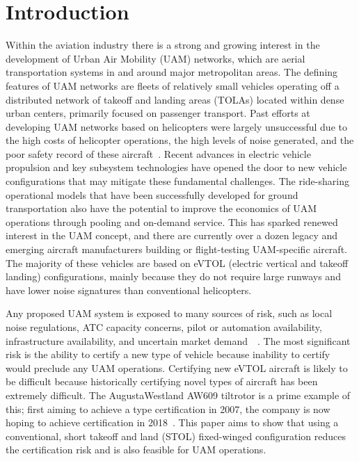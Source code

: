 \documentclass[]{aiaa-tc}%
\begin{document}
\section{Introduction}
Within the aviation industry there is a strong and growing interest in the development of Urban Air Mobility (UAM) networks,  which are aerial transportation systems in and around major metropolitan areas.  The defining features of UAM networks are fleets of relatively small vehicles operating off a distributed network of takeoff and landing areas (TOLAs) located within dense urban centers, primarily focused on passenger transport. Past efforts at developing UAM networks based on helicopters were largely unsuccessful due to the high costs of helicopter operations, the high levels of noise generated, and the poor safety record of these aircraft~\cite{Vascik2017}.  Recent advances in electric vehicle propulsion and key subsystem technologies have opened the door to new vehicle configurations that may mitigate these fundamental challenges.  The ride-sharing operational models that have been successfully developed for ground transportation also have the potential to improve the economics of UAM  operations through pooling and on-demand service. This has sparked renewed interest in the UAM concept, and there are currently over a dozen legacy and emerging aircraft manufacturers building or flight-testing UAM-specific aircraft. The majority of these vehicles are based on eVTOL (electric vertical and takeoff landing) configurations, mainly because they do not require large runways and have lower noise signatures than conventional helicopters.  

Any proposed UAM system is exposed to many sources of risk, such as local noise regulations, ATC capacity concerns, pilot or automation availability, infrastructure availability, and uncertain market demand~\cite{Vascik2017}~\cite{Uber}.  The most significant risk is the ability to certify a new type of vehicle because inability to certify would preclude any UAM operations.  Certifying new eVTOL aircraft is likely to be difficult because historically certifying novel types of aircraft has been extremely difficult. The AugustaWestland AW609 tiltrotor is a prime example of this;  first aiming to achieve a type certification  in 2007, the company is now hoping to achieve certification in 2018~\cite{AW609}.  This paper aims to show that using a conventional, short takeoff and land (STOL) fixed-winged configuration reduces the certification risk and is also feasible for UAM operations.   
\end{document}
